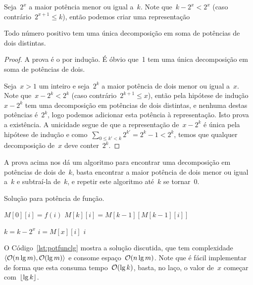 \documentclass[main.tex]{subfiles}
\begin{document}
Seja~$2^x$ a maior potência menor ou igual a~$k$. Note que~$k - 2^x < 2^x$ (caso contrário~$2^{x+1} \leq k$), então podemos criar uma representação
\begin{theorem} \label{thm:pot2}
	Todo número positivo tem uma única decomposição em soma de potências de dois distintas.
\end{theorem}
\begin{proof}
	A prova é o por indução. É óbvio que~1 tem uma única decomposição em soma de potências de dois.

	Seja~$x > 1$ um inteiro e seja~$2^k$ a maior potência de dois menor ou igual a~$x$. Note que~$x - 2^k < 2^k$ (caso contrário~$2^{k+1} \leq x$), então pela hipótese de indução~$x - 2^k$ tem uma decomposição em potências de dois distintas, e nenhuma destas potências é~$2^k$, logo podemos adicionar esta potência à representação. Isto prova a existência. A unicidade segue de que a representação de~$x - 2^k$ é única pela hipótese de indução e como~$\sum\limits_{0 \leq k' < k}{2^{k'}} = 2^k - 1 < 2^k$, temos que qualquer decomposição de~$x$ deve conter~$2^k$.
\end{proof}

A prova acima nos dá um algoritmo para encontrar uma decomposição em potências de dois de~$k$, basta encontrar a maior potência de dois menor ou igual a~$k$ e subtraí-la de~$k$, e repetir este algoritmo até~$k$ se tornar~0.

\begin{algorithm}
	\caption{Solução para potência de função.} \label{lst:potfunclg}
\begin{algorithmic}[1]
			\State $M[0][i] = f(i)$
		\EndFor
				\State $M[k][i] = M[k - 1][M[k - 1][i]]$
			\EndFor
		\EndFor
	\EndFunction

				\State $k = k - 2^x$
				\State $i = M[x][i]$
			\EndIf
		\EndFor
		\State \Return $i$
	\EndFunction
\end{algorithmic}
\end{algorithm}

O Código~\ref{lst:potfunclg} mostra a solução discutida, que tem complexidade~$\langle\mathcal{O}(n\lg m), \mathcal{O}(\lg m)\rangle$ e consome espaço~$\mathcal{O}(n \lg m)$. Note que é fácil implementar~ de forma que esta consuma tempo~$\mathcal{O}(\lg k)$, basta, no laço, o valor de~$x$ começar com~$\lfloor\lg k\rfloor$.
\end{document}
